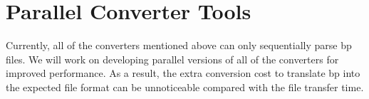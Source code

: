 %
%
%
%
%
%
%


\section{Parallel Converter Tools}

Currently, all of the converters mentioned above can only sequentially parse bp 
files. We will work on developing parallel versions of all of the converters for 
improved performance. As a result, the extra conversion cost to translate bp into 
the expected file format can be unnoticeable compared with the file transfer time. 

